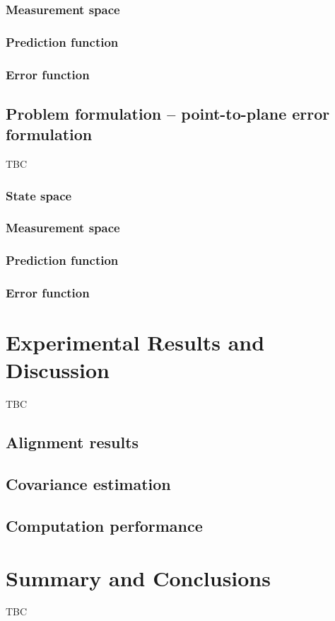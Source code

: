 \subsubsection{Measurement space}
\subsubsection{Prediction function}
\subsubsection{Error function}

\subsection{Problem formulation -- point-to-plane error formulation}

TBC

\subsubsection{State space}
\subsubsection{Measurement space}
\subsubsection{Prediction function}
\subsubsection{Error function}

\section{Experimental Results and Discussion}\label{sec:features:results}

TBC

\subsection{Alignment results}
\subsection{Covariance estimation}
\subsection{Computation performance}

\section{Summary and Conclusions}\label{sec:distance-maps:conclusions}

TBC
